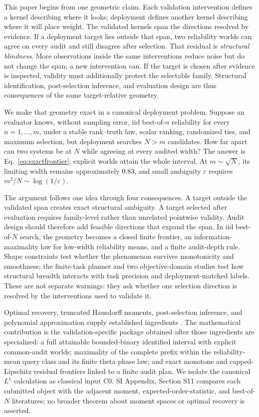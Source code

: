 \documentclass[10pt,twocolumn]{article}
\begin{document}
This paper begins from one geometric claim. Each validation intervention defines a kernel describing where it looks; deployment defines another kernel describing where it will place weight. The validated kernels span the directions resolved by evidence. If a deployment target lies outside that span, two reliability worlds can agree on every audit and still disagree after selection. That residual is \emph{structural blindness}. More observations inside the same interventions reduce noise but do not change the span; a new intervention can. If the target is chosen after evidence is inspected, validity must additionally protect the selectable family. Structural identification, post-selection inference, and evaluation design are thus consequences of the same target-relative geometry.

We make that geometry exact in a canonical deployment problem. Suppose an evaluator knows, without sampling error, iid best-of-$n$ reliability for every $n=1,\ldots,m$, under a stable rank--truth law, scalar ranking, randomized ties, and maximum selection, but deployment searches $N>m$ candidates. How far apart can two systems be at $N$ while agreeing at every audited width? The answer is Eq.~\ref{eq:exactfrontier}; explicit worlds attain the whole interval. At $m\sim\sqrt N$, its limiting width remains approximately $0.83$, and small ambiguity $\varepsilon$ requires $m^2/N\sim\log(1/\varepsilon)$.

The argument follows one idea through four consequences. A target outside the validated span creates exact structural ambiguity. A target selected after evaluation requires family-level rather than unrelated pointwise validity. Audit design should therefore add feasible directions that expand the span. In iid best-of-$N$ search, the geometry becomes a closed finite frontier, an information-maximality law for low-width reliability means, and a finite audit-depth rule. Shape constraints test whether the phenomenon survives monotonicity and smoothness; the finite-task planner and two objective-domain studies test how structural breadth interacts with task precision and deployment-matched labels. These are not separate warnings: they ask whether one selection direction is resolved by the interventions used to validate it.

Optimal recovery, truncated Hausdorff moments, post-selection inference, and polynomial approximation supply established ingredients \citep{donoho1994,manski2003,berk2013,zrnic2023,hausdorff1921,dette1997}. The mathematical contribution is the validation-specific package obtained after those ingredients are specialized: a full attainable bounded-binary identified interval with explicit common-audit worlds; maximality of the complete prefix within the reliability-mean query class and its finite theta phase law; and exact monotone and capped-Lipschitz residual frontiers linked to a finite audit plan. We isolate the canonical $L^1$ calculation as classical input C0. SI Appendix, Section S11 compares each submitted object with the adjacent moment, expected-order-statistic, and best-of-$N$ literatures; no broader theorem about moment spaces or optimal recovery is asserted.
\end{document}
